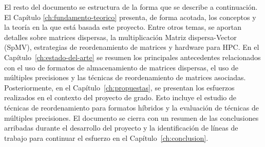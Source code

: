 El resto del documento se estructura de la forma que se describe a continuación.
El Capítulo \ref{ch:fundamento-teorico} presenta, de forma acotada, los conceptos y la teoría en la que está basada este proyecto. Entre otros temas, se aportan detalles sobre matrices dispersas, la multiplicación Matriz dispersa-Vector (SpMV), estrategias de reordenamiento de matrices y hardware para HPC.
En el Capítulo~\ref{ch:estado-del-arte} se resumen los principales antecedentes relacionados con el uso de formatos de almacenamiento de matrices dispersas, el uso de múltiples precisiones y las técnicas de reordenamiento de matrices asociadas.
Posteriormente, en el Capítulo~\ref{ch:propuestas}, se presentan los esfuerzos realizados en el contexto del proyecto de grado. Esto incluye el estudio de técnicas de reordenamiento para formatos híbridos y la evaluación de técnicas de múltiples precisiones. 
El documento se cierra con un resumen de las conclusiones arribadas durante el desarrollo del proyecto y la identificación de líneas de trabajo para continuar el esfuerzo en el Capítulo~\ref{ch:conclusion}.



	


